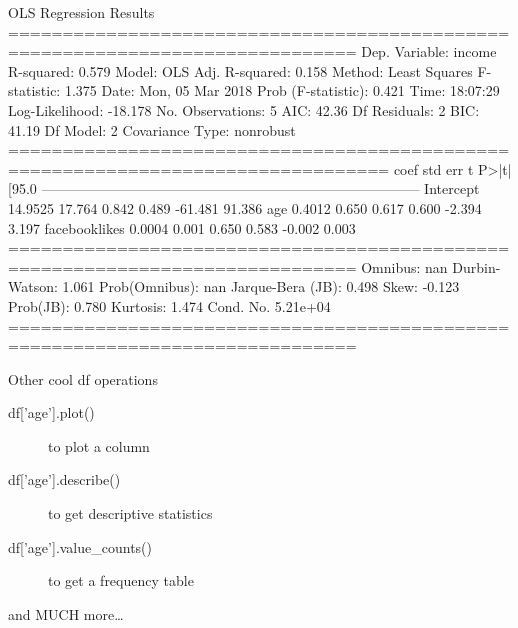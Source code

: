 \documentclass{beamer}
\begin{document}
\begin{frame}{}

\begin{lstlistingoutputtiny}
OLS Regression Results                            
==============================================================================
Dep. Variable:                 income   R-squared:                       0.579
Model:                            OLS   Adj. R-squared:                  0.158
Method:                 Least Squares   F-statistic:                     1.375
Date:                Mon, 05 Mar 2018   Prob (F-statistic):              0.421
Time:                        18:07:29   Log-Likelihood:                -18.178
No. Observations:                   5   AIC:                             42.36
Df Residuals:                       2   BIC:                             41.19
Df Model:                           2                                         
Covariance Type:            nonrobust                                         
=================================================================================
coef    std err          t      P>|t|      [95.0%
---------------------------------------------------------------------------------
Intercept        14.9525     17.764      0.842      0.489       -61.481    91.386
age               0.4012      0.650      0.617      0.600        -2.394     3.197
facebooklikes     0.0004      0.001      0.650      0.583        -0.002     0.003
==============================================================================
Omnibus:                          nan   Durbin-Watson:                   1.061
Prob(Omnibus):                    nan   Jarque-Bera (JB):                0.498
Skew:                          -0.123   Prob(JB):                        0.780
Kurtosis:                       1.474   Cond. No.                     5.21e+04
==============================================================================

\end{lstlistingoutputtiny}
	
\end{frame}




\begin{frame}[fragile]{Other cool df operations}
\begin{description}
	\item[df{['age']}.plot()] to plot a column
	\item[df{['age']}.describe()] to get descriptive statistics 
	\item[df{['age']}.value\_counts()] to get a frequency table
\end{description}
and MUCH more\ldots
	
\end{frame}
\end{document}
